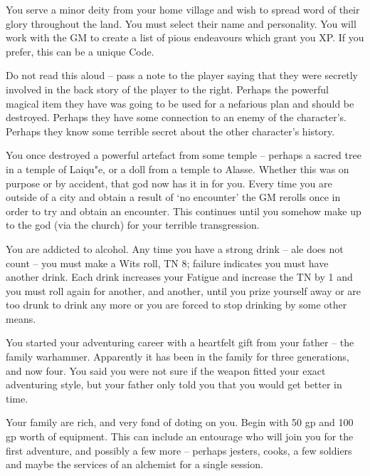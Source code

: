 \begin{list}{\addtocounter{list}{1}\textbf{:}}{\raggedleft}
\item{You serve a minor deity from your home village and wish to spread word of their glory throughout the land.  You must select their name and personality.  You will work with the GM to create a list of pious endeavours which grant you XP.  If you prefer, this can be a unique Code.}

\item{Do not read this aloud -- pass a note to the player saying that they were secretly involved in the back story of the player to the right.  Perhaps the powerful magical item they have was going to be used for a nefarious plan and should be destroyed.  Perhaps they have some connection to an enemy of the character's.  Perhaps they know some terrible secret about the other character's history.}

\item{You once destroyed a powerful artefact from some temple -- perhaps a sacred tree in a temple of Laiqu"{e}, or a doll from a temple to Alasse. Whether this was on purpose or by accident, that god now has it in for you.  Every time you are outside of a city and obtain a result of `no encounter' the GM rerolls once in order to try and obtain an encounter. This continues until you somehow make up to the god (via the church) for your terrible transgression.}

\item{You are addicted to alcohol.  Any time you have a strong drink -- ale does not count -- you must make a Wits roll, TN 8; failure indicates you must have another drink.  Each drink increases your Fatigue and increase the TN by 1 and you must roll again for another, and another, until you prize yourself away or are too drunk to drink any more or you are forced to stop drinking by some other means.}

\item{You started your adventuring career with a heartfelt gift from your father -- the family warhammer.  Apparently it has been in the family for three generations, and now four.  You said you were not sure if the weapon fitted your exact adventuring style, but your father only told you that you would get better in time.}

\item{Your family are rich, and very fond of doting on you.  Begin with 50 gp and 100 gp worth of equipment.  This can include an entourage who will join you for the first adventure, and possibly a few more -- perhaps jesters, cooks, a few soldiers and maybe the services of an alchemist for a single session.}


\end{list}
